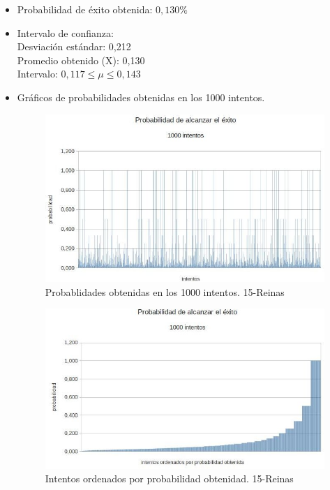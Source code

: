 \documentclass[a4paper,10pt]{article}
\begin{document}
\begin{itemize}
 \item Probabilidad de éxito obtenida: $0,130\%$
 \item Intervalo de confianza: \\
  Desviación estándar: 0,212 \\
  Promedio obtenido (X): 0,130\\
  Intervalo: $ 0,117 \leq \mu \leq 0,143$ \\
 \item Gráficos de probabilidades obtenidas en los 1000 intentos.

\begin{figure}
 \centering
 \includegraphics[scale=0.5]{probabilidad15.jpg}
 \caption{Probablidades obtenidas en los 1000 intentos. 15-Reinas}
 \label{fig:prob15}
\end{figure}

\begin{figure}
 \centering
 \includegraphics[scale=0.5]{./probabilidadOrden15.jpg}
 \caption{Intentos ordenados por probabilidad obtenidad. 15-Reinas}
 \label{fig:prob15Ord}
\end{figure}


\end{itemize}
\end{document}
